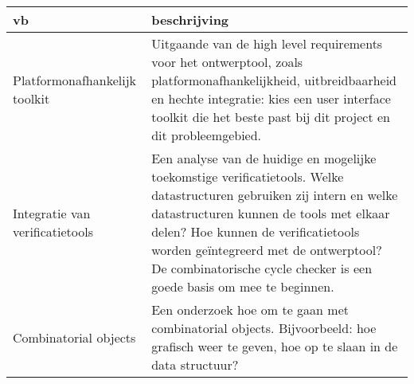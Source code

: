 \begin{center}
    \begin{tabular}{|p{13em}|p{22em}|}
	\hline
        {\bf vb}		& {\bf beschrijving} \\\hline

	Platformonafhankelijk toolkit &
	Uitgaande van de high level requirements voor het ontwerptool, zoals
	platformonafhankelijkheid, uitbreidbaarheid en hechte integratie: kies een user interface
	toolkit die het beste past bij dit project en dit probleemgebied.\\\hline

	Integratie van verificatietools &
	Een analyse van de huidige en mogelijke toekomstige verificatietools. Welke
	datastructuren gebruiken zij intern en welke datastructuren kunnen de tools
	met elkaar delen? Hoe kunnen de verificatietools worden ge\"integreerd met
	de ontwerptool? De combinatorische cycle checker is een goede basis om mee
	te beginnen.\\\hline

	Combinatorial objects &
	Een onderzoek hoe om te gaan met combinatorial objects. Bijvoorbeeld: hoe grafisch weer
	te geven, hoe op te slaan in de data structuur?\\\hline

    \end{tabular}
\end{center}

